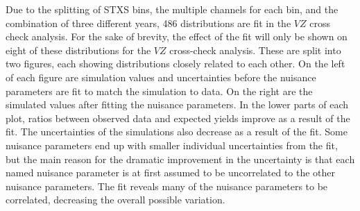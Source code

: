 Due to the splitting of STXS bins, the multiple channels for each bin, and the combination of three different years,
486 distributions are fit in the $V\!Z$ cross check
analysis.   
For the sake of brevity, the effect of the fit will only be shown on eight of these distributions for the $V\!Z$
cross-check analysis.
These are split into two figures, each showing distributions closely related to each other.
On the left of each figure are simulation values and uncertainties
before the nuisance parameters are fit to match the simulation to data.
On the right are the simulated values after fitting the nuisance parameters.
In the lower parts of each plot, ratios between observed data and expected yields improve as a result of the fit.
The uncertainties of the simulations also decrease as a result of the fit.
Some nuisance parameters end up with smaller individual uncertainties from the fit,
but the main reason for the dramatic improvement in the uncertainty is that each named nuisance parameter is at first
assumed to be uncorrelated to the other nuisance parameters. 
The fit reveals many of the nuisance parameters to be correlated,
decreasing the overall possible variation. 


